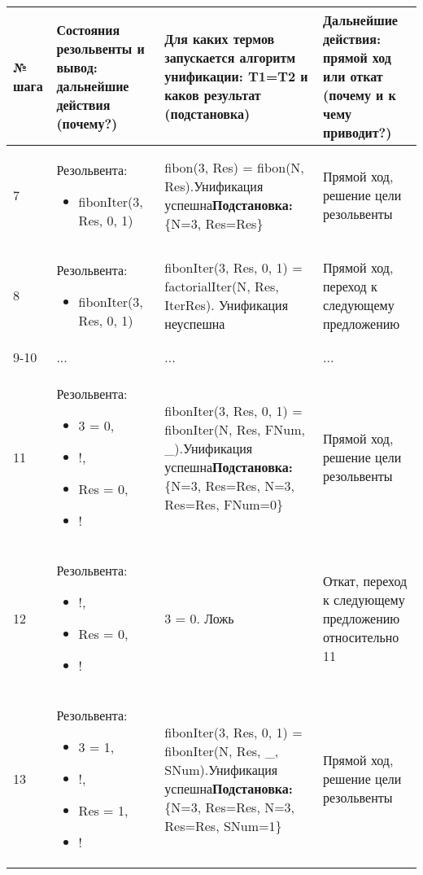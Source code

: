 \documentclass[14pt,a4paper]{scrreprt}
\begin{document}
\begin{table}[H]
	\begin{tabular}{|p{0.8cm\small}|p{4.7cm\small}|p{5.7cm\small}|p{4cm\small}|}	
		\hline
		№ шага & Состояния резольвенты и вывод: дальнейшие действия (почему?) & Для каких термов запускается алгоритм унификации: T1=T2 и каков результат (подстановка) & Дальнейшие действия: прямой ход или откат (почему и к чему приводит?)\\
		\hline
		7 & Резольвента:\begin{itemize} \item fibonIter(3, Res, 0, 1) \end{itemize} & fibon(3, Res) = fibon(N, Res).Унификация успешна\linebreak \textbf{Подстановка:} \{N=3, Res=Res\} & Прямой ход, решение цели резольвенты\\
		\hline
		8 & Резольвента:\begin{itemize} \item fibonIter(3, Res, 0, 1) \end{itemize} & fibonIter(3, Res, 0, 1) = factorialIter(N, Res, IterRes). Унификация неуспешна & Прямой ход, переход к следующему предложению \\
		\hline
		9-10 & ... & ... & ...\\
		\hline
		11 & Резольвента:\begin{itemize} \item 3 = 0, \item !, \item Res = 0, \item ! \end{itemize} & fibonIter(3, Res, 0, 1) = fibonIter(N, Res, FNum, \_).Унификация успешна\linebreak \textbf{Подстановка:} \{N=3, Res=Res, N=3, Res=Res, FNum=0\} & Прямой ход, решение цели резольвенты\\
		\hline
		12 & Резольвента:\begin{itemize} \item !, \item Res = 0, \item ! \end{itemize} & 3 = 0. Ложь & Откат, переход к следующему предложению относительно 11\\
		\hline
		13 & Резольвента:\begin{itemize} \item 3 = 1, \item !, \item Res = 1, \item ! \end{itemize} & fibonIter(3, Res, 0, 1) = fibonIter(N, Res, \_, SNum).Унификация успешна\linebreak \textbf{Подстановка:} \{N=3, Res=Res, N=3, Res=Res, SNum=1\} & Прямой ход, решение цели резольвенты\\

\end{tabular}
\end{table}
\end{document}
